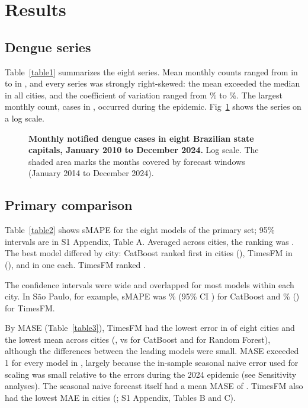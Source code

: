 \documentclass[10pt,letterpaper]{article}
\begin{document}
\section*{Results}
\subsection*{Dengue series}
Table~\ref{table1} summarizes the eight series. Mean monthly counts ranged from  in  to  in , and every series was strongly right-skewed: the mean exceeded the median in all cities, and the coefficient of variation ranged from \% to \%. The largest monthly count,  cases in , occurred during the  epidemic. Fig~\ref{fig1} shows the series on a log scale.



\begin{figure}[!h]
\caption{\textbf{Monthly notified dengue cases in eight Brazilian state capitals, January 2010 to December 2024.}
Log scale. The shaded area marks the months covered by forecast windows (January 2014 to December 2024).}
\label{fig1}
\end{figure}

\subsection*{Primary comparison}
Table~\ref{table2} shows sMAPE for the eight models of the primary set; 95\% intervals are in S1 Appendix, Table A. Averaged across cities, the ranking was . The best model differed by city: CatBoost ranked first in  cities (), TimesFM in  (), and  in one each. TimesFM ranked .



The confidence intervals were wide and overlapped for most models within each city. In S\~ao Paulo, for example, sMAPE was \% (95\% CI ) for CatBoost and \% () for TimesFM.

By MASE (Table~\ref{table3}), TimesFM had the lowest error in  of eight cities and the lowest mean across cities (, vs  for CatBoost and  for Random Forest), although the differences between the leading models were small. MASE exceeded 1 for every model in , largely because the in-sample seasonal naive error used for scaling was small relative to the errors during the 2024 epidemic (see Sensitivity analyses). The seasonal naive forecast itself had a mean MASE of . TimesFM also had the lowest MAE in  cities (; S1 Appendix, Tables B and C).
\end{document}
